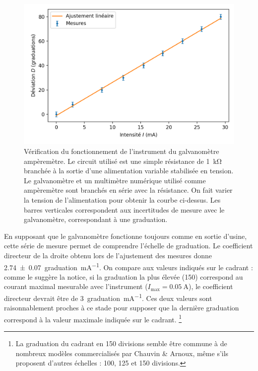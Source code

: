 \documentclass[12pt,a4paper,fleqn]{article}
\begin{document}
\begin{figure}[htbp]
    \center
    \includegraphics[scale=1]{images/mesure.png}
    \caption{Vérification du fonctionnement de l'instrument du galvanomètre ampèremètre.
    Le circuit utilisé est une simple résistance de \SI{1}{\kilo\ohm} branchée à la sortie d'une alimentation variable stabilisée en tension.
    Le galvanomètre et un multimètre numérique utilisé comme ampèremètre sont branchés en série avec la résistance.
    On fait varier la tension de l'alimentation pour obtenir la courbe ci-dessus.
    Les barres verticales correspondent aux incertitudes de mesure avec le galvanomètre, correspondant à une graduation.}
    \label{fig:galva_amp_mes}
\end{figure}

En supposant que le galvanomètre fonctionne toujours comme en sortie d'usine, cette série de mesure permet de comprendre l'échelle de graduation.
Le coefficient directeur de la droite obtenu lors de l'ajustement des mesures donne \SI{2.74(7)}{graduation\per\milli\ampere}.
On compare aux valeurs indiqués sur le cadrant : comme le suggère la notice, si la graduation la plus élevée (150) correspond au courant maximal mesurable avec l'instrument ($I_\mathrm{max}=\SI{0.05}{\ampere}$), le coefficient directeur devrait être de \SI{3}{graduation\per\milli\ampere}.
Ces deux valeurs sont raisonnablement proches à ce stade pour supposer que la dernière graduation correspond à la valeur maximale indiquée sur le cadrant.
\footnote{La graduation du cadrant en 150 divisions semble être commune à de nombreux modèles commercialisés par Chauvin \& Arnoux, même s'ils proposent d'autres échelles : 100, 125 et 150 divisions.}
\end{document}
